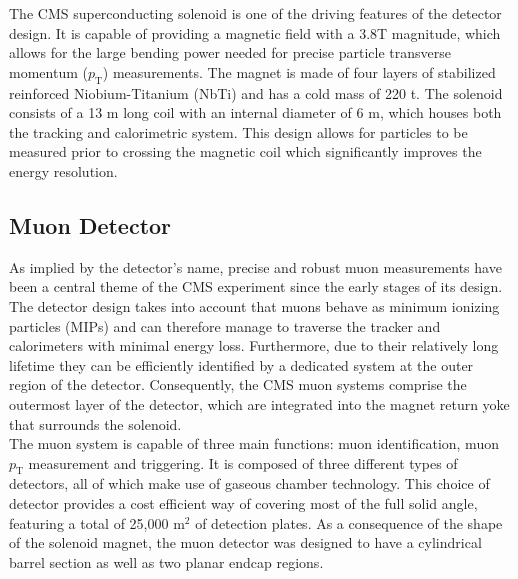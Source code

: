 The CMS superconducting solenoid is one of the driving features of the detector design. It is capable of providing a magnetic field with a 3.8T magnitude, which allows for the large bending power needed for  precise particle transverse momentum ($p_{\text{T}}$) measurements. The magnet is made of four layers of stabilized reinforced Niobium-Titanium (NbTi) and has a cold mass of 220 t. The solenoid consists of a 13 m long coil with an internal diameter of 6 m, which houses both the tracking and calorimetric system. This design allows for particles to be measured prior to crossing the magnetic coil which significantly improves the energy resolution. 

\subsection{Muon Detector}

 As implied by the detector's name, precise and robust muon measurements have been a central theme of the CMS experiment since the early stages of its design. The detector design takes into account that muons behave as minimum ionizing particles (MIPs)\cite{MIPs} and can therefore manage to traverse
the tracker and calorimeters with minimal energy loss. Furthermore, due to their relatively long lifetime they can be efficiently identified by a dedicated system at the outer region of the detector. Consequently, the CMS muon systems comprise the outermost layer of the detector, which are integrated into the magnet return yoke that surrounds the solenoid.\\

The muon system is capable of three main functions: muon identification, muon $p_{\text{T}}$ measurement and triggering. It is composed of three different types of detectors, all of which make use of gaseous chamber technology. This choice of detector provides a cost efficient way of covering most of the full solid angle, featuring a total of 25,000 m$^2$ of detection plates. As a consequence of the shape of the solenoid magnet, the muon detector was designed to have a cylindrical barrel section as well as two planar endcap regions.\\

